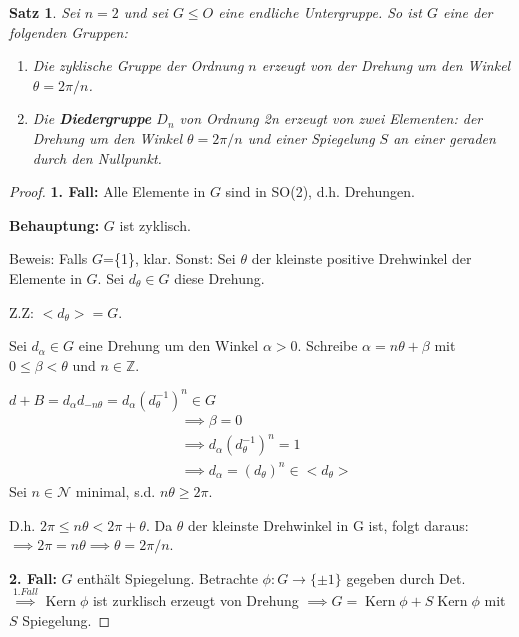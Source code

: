 \documentclass{article}
\theoremstyle{plain}
\newtheorem{theorem}{Satz}
\renewcommand{\ker}{\mathop{\mathrm{Kern}}}
\newcommand{\defn}[1]{\textbf{#1}}
\newcommand{\Z}{\mathbb{Z}}
\newcommand{\N}{\mathcal{N}}
\newcommand{\ug}{\leq}
\newcommand{\zykl}[1]{{<}{#1}{>}}
\begin{document}
\begin{theorem}
    Sei $n=2$ und sei $G\ug O$ eine endliche Untergruppe. 
    So ist $G$ eine der folgenden Gruppen:
    \begin{enumerate}[label=(\alph*)]
        \item Die zyklische Gruppe der Ordnung $n$ erzeugt von der Drehung um den Winkel $\theta=2\pi/n$.
        \item Die \defn{Diedergruppe } $D_n$ von Ordnung 2n erzeugt von zwei Elementen: der Drehung um den Winkel $\theta=2\pi/n$ und einer Spiegelung $S$ an einer geraden durch den Nullpunkt.
    \end{enumerate}
\end{theorem}
\begin{proof}
    \textbf{1. Fall:} Alle Elemente in $G$ sind in SO(2), d.h. Drehungen. %
    
    \textbf{Behauptung:} $G$ ist zyklisch.
    
    Beweis: Falls $G$=\{1\}, klar.
    Sonst: Sei $\theta$ der kleinste positive Drehwinkel der Elemente in $G$. Sei $d_\theta\in G$ diese Drehung.
    
    Z.Z: $\zykl{d_\theta}=G$.

    Sei $d_\alpha\in G$ eine Drehung um den Winkel $\alpha>0$. 
    Schreibe $\alpha=n\theta+\beta$ mit $0\leq\beta<\theta$ und $n\in\Z$.

    $d+B=d_\alpha d_{-n\theta}=d_\alpha(d_\theta^{-1})^n\in G$
    \begin{align*}
        &\implies \beta=0\\
        &\implies d_\alpha(d_\theta^{-1})^n=1\\
        &\implies d_\alpha=(d_\theta)^n\in\zykl{d_\theta}
    \end{align*}
    Sei $n\in\N$ minimal, s.d. $n\theta\geq2\pi$.
    
    D.h. $2\pi\leq n\theta<2\pi+\theta$.
    Da $\theta$ der kleinste Drehwinkel in G ist, folgt daraus:
    $\implies 2\pi=n\theta\implies\theta=2\pi/n$.


    \textbf{2. Fall:} $G$ enthält Spiegelung. Betrachte $\phi\colon G\to\{\pm1\}$ gegeben durch Det.
    $\overset{1. Fall}{\implies} \ker\phi$ ist zurklisch erzeugt von Drehung $\implies G=\ker\phi+S\ker\phi$ mit $S$ Spiegelung.
\end{proof}
\end{document}
